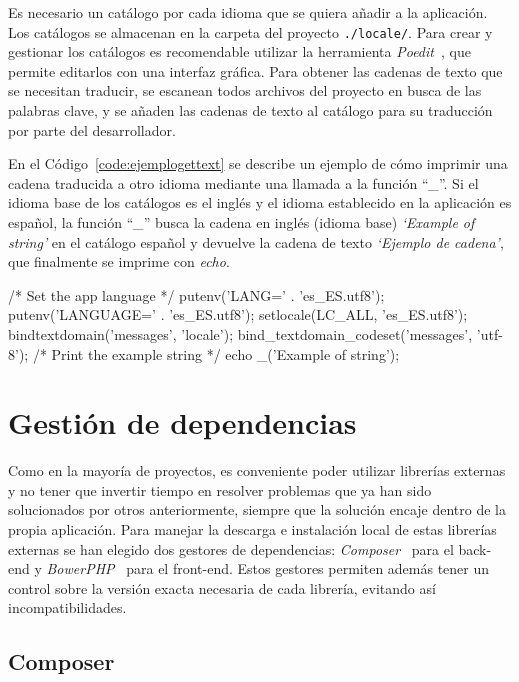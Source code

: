 Es necesario un catálogo por cada idioma que se quiera añadir a la aplicación.
Los catálogos se almacenan en la carpeta del proyecto \texttt{./locale/}.
Para crear y gestionar los catálogos es recomendable utilizar la herramienta \textit{Poedit}~\cite{poedit}, que permite editarlos con una interfaz gráfica.
Para obtener las cadenas de texto que se necesitan traducir, se escanean todos archivos del proyecto en busca de las palabras clave, y se añaden las cadenas de texto al catálogo para su traducción por parte del desarrollador.

En el Código~\ref{code:ejemplogettext} se describe un ejemplo de cómo imprimir una cadena traducida a otro idioma mediante una llamada a la función ``\textit{\_}''.
Si el idioma base de los catálogos es el inglés y el idioma establecido en la aplicación es español, la función ``\textit{\_}'' busca la cadena en inglés (idioma base) \textit{`Example of string'} en el catálogo español y devuelve la cadena de texto \textit{`Ejemplo de cadena'}, que finalmente se imprime con \textit{echo}.

\begin{code}[label=code:ejemplogettext,language=php,caption=Ejemplo de traducción en \gls{PHP} con la librería \textit{gettext}]
/* Set the app language */
putenv('LANG=' . 'es_ES.utf8');
putenv('LANGUAGE=' . 'es_ES.utf8');
setlocale(LC_ALL, 'es_ES.utf8');
bindtextdomain('messages', 'locale');
bind_textdomain_codeset('messages', 'utf-8');
/* Print the example string */
echo _('Example of string');
\end{code}


\section{Gestión de dependencias\label{extra:mvc:dependencias}}

Como en la mayoría de proyectos, es conveniente poder utilizar librerías externas y no tener que invertir tiempo en resolver problemas que ya han sido solucionados por otros anteriormente, siempre que la solución encaje dentro de la propia aplicación.
Para manejar la descarga e instalación local de estas librerías externas se han elegido dos gestores de dependencias: \textit{Composer}~\cite{composer} para el \gls{back-end} y \textit{BowerPHP}~\cite{bowerphp} para el \gls{front-end}.
Estos gestores permiten además tener un control sobre la versión exacta necesaria de cada librería, evitando así incompatibilidades.

\subsection*{Composer\label{extra:mvc:composer}}

